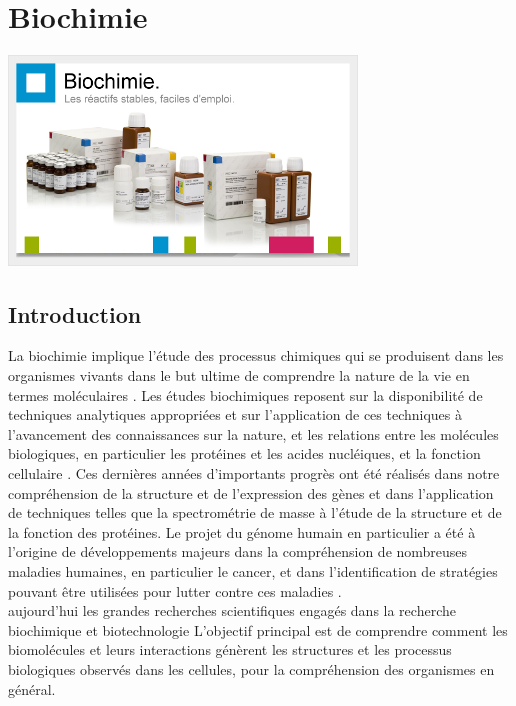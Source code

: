 \documentclass[12pt]{report}
\begin{document}
\chapter{Biochimie}
\includegraphics[width=350]{biochimie_head_fr.jpg} 
\newpage
\section{Introduction}
La biochimie implique l'étude des processus chimiques qui se produisent dans les organismes vivants dans le but ultime de comprendre la nature de la vie en termes moléculaires \cite{ref5} . Les études biochimiques reposent sur la disponibilité de techniques analytiques appropriées et sur l'application de ces techniques à l'avancement des connaissances sur la nature, et les relations entre les molécules biologiques, en particulier les protéines et les acides nucléiques, et la fonction cellulaire \cite{ref5} . Ces dernières années d'importants progrès ont été réalisés dans notre compréhension de la structure et de l'expression des gènes et dans l'application de techniques telles que la spectrométrie de masse à l'étude de la structure et de la fonction des protéines.
Le projet du génome humain en particulier a été à l'origine de développements majeurs dans la compréhension de nombreuses maladies humaines, en particulier le cancer, et dans l'identification de stratégies pouvant être utilisées pour lutter contre ces maladies \cite{ref5} .\\aujourd'hui les grandes recherches scientifiques engagés dans la recherche biochimique et biotechnologie L'objectif principal  est de comprendre comment les biomolécules et leurs interactions génèrent les structures et les processus biologiques observés dans les cellules, pour la compréhension des organismes en général.
\newpage
\end{document}
